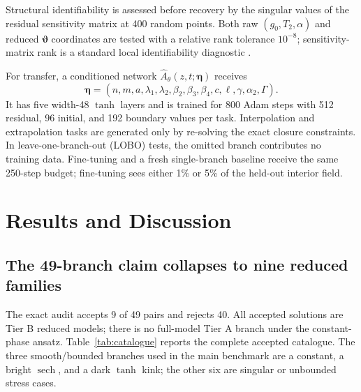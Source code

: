 \documentclass[11pt]{article}
\newcommand{\sech}{\operatorname{sech}}
\begin{document}
Structural identifiability is assessed before recovery by the singular values
of the residual sensitivity matrix at 400 random points.  Both raw
$(g_0,T_2,\alpha)$ and reduced $\boldsymbol{\vartheta}$ coordinates are tested
with a relative rank tolerance $10^{-8}$; sensitivity-matrix rank is a standard
local identifiability diagnostic \citep{iliadis2019}.

For transfer, a conditioned network
$\widehat A_\theta(z,t;\boldsymbol{\eta})$ receives
\begin{equation}
\boldsymbol{\eta}=(n,m,a,\lambda_1,\lambda_2,
\beta_2,\beta_3,\beta_4,c,\ell,\gamma,\alpha_2,\Gamma).
\end{equation}
It has five width-48 $\tanh$ layers and is trained for 800 Adam steps with 512
residual, 96 initial, and 192 boundary values per task.  Interpolation and
extrapolation tasks are generated only by re-solving the exact closure
constraints.  In leave-one-branch-out (LOBO) tests, the omitted branch
contributes no training data.  Fine-tuning and a fresh single-branch baseline
receive the same 250-step budget; fine-tuning sees either 1\% or 5\% of the
held-out interior field.

\section{Results and Discussion}
\label{sec:results}

\subsection{The 49-branch claim collapses to nine reduced families}

The exact audit accepts 9 of 49 pairs and rejects 40.  All accepted solutions
are Tier B reduced models; there is no full-model Tier A branch under the
constant-phase ansatz.  Table~\ref{tab:catalogue} reports the complete accepted
catalogue.  The three smooth/bounded branches used in the main benchmark are a
constant, a bright $\sech$, and a dark $\tanh$ kink; the other six are singular
or unbounded stress cases.
\end{document}
